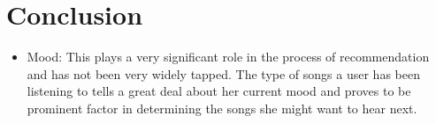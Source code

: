 	\section{Conclusion}
\begin{itemize}
	\item Mood: This plays a very significant role in the process of recommendation and has not been very widely tapped. The type of songs a user has been listening to tells a great deal about her current mood and proves to be prominent factor in determining the songs she might want to hear next.
\end{itemize}
